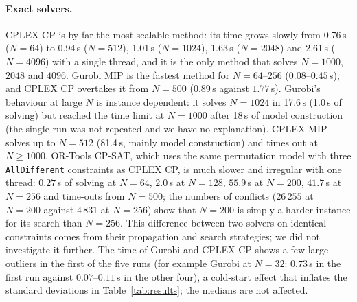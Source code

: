 \documentclass[a4paper,fleqn]{cas-sc}
\begin{document}
\paragraph{Exact solvers.}
CPLEX CP is by far the most scalable method: its time grows slowly from 0.76\,s ($N=64$) to 0.94\,s ($N=512$), 1.01\,s ($N=1024$), 1.63\,s ($N=2048$) and 2.61\,s ($N=4096$) with a single thread, and it is the only method that solves $N=1000$, $2048$ and $4096$.
Gurobi MIP is the fastest method for $N=64$--$256$ ($0.08$--$0.45$\,s), and CPLEX CP overtakes it from $N=500$ ($0.89$\,s against $1.77$\,s).
Gurobi's behaviour at large $N$ is instance dependent: it solves $N=1024$ in 17.6\,s (1.0\,s of solving) but reached the time limit at $N=1000$ after 18\,s of model construction (the single run was not repeated and we have no explanation).
CPLEX MIP solves up to $N=512$ (81.4\,s, mainly model construction) and times out at $N\ge1000$.
OR-Tools CP-SAT, which uses the same permutation model with three \texttt{AllDifferent} constraints as CPLEX CP, is much slower and irregular with one thread: $0.27$\,s of solving at $N=64$, $2.0$\,s at $N=128$, $55.9$\,s at $N=200$, $41.7$\,s at $N=256$ and time-outs from $N=500$; the numbers of conflicts ($26\,255$ at $N=200$ against $4\,831$ at $N=256$) show that $N=200$ is simply a harder instance for its search than $N=256$.
This difference between two solvers on identical constraints comes from their propagation and search strategies; we did not investigate it further.
The time of Gurobi and CPLEX CP shows a few large outliers in the first of the five runs (for example Gurobi at $N=32$: $0.73$\,s in the first run against $0.07$--$0.11$\,s in the other four), a cold-start effect that inflates the standard deviations in Table~\ref{tab:results}; the medians are not affected.
\end{document}
